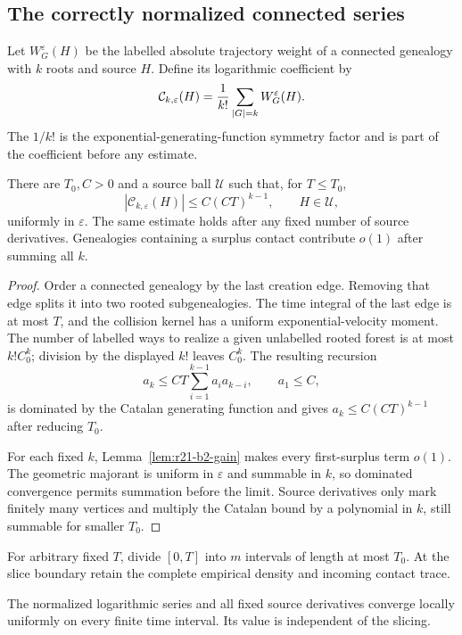\subsection{The correctly normalized connected series}

Let $W_G^\varepsilon(H)$ be the labelled absolute trajectory weight of a
connected genealogy with $k$ roots and source $H$.  Define its logarithmic
coefficient by
\[
 \mathcal C_{k,\varepsilon}(H)=
 {1\over k!}\sum_{|G|=k}W_G^\varepsilon(H).
\]
The $1/k!$ is the exponential-generating-function symmetry factor and is part
of the coefficient before any estimate.

\begin{theorem}
\label{thm:r21-b2-majorant}
There are $T_0,C>0$ and a source ball $\mathcal U$ such that, for
$T\le T_0$,
\[
 |\mathcal C_{k,\varepsilon}(H)|
 \le C(C T)^{k-1},
 \qquad H\in\mathcal U,
\]
uniformly in $\varepsilon$.  The same estimate holds after any fixed number
of source derivatives.  Genealogies containing a surplus contact contribute
$o(1)$ after summing all $k$.
\end{theorem}

\begin{proof}
Order a connected genealogy by the last creation edge.  Removing that edge
splits it into two rooted subgenealogies.  The time integral of the last edge
is at most $T$, and the collision kernel has a uniform exponential-velocity
moment.  The number of labelled ways to realize a given unlabelled rooted
forest is at most $k!C_0^k$; division by the displayed $k!$ leaves $C_0^k$.
The resulting recursion
\[
 a_k\le CT\sum_{i=1}^{k-1}a_i a_{k-i},
 \qquad a_1\le C,
\]
is dominated by the Catalan generating function and gives
$a_k\le C(CT)^{k-1}$ after reducing $T_0$.

For each fixed $k$, Lemma~\ref{lem:r21-b2-gain} makes every first-surplus term
$o(1)$.  The geometric majorant is uniform in $\varepsilon$ and summable in
$k$, so dominated convergence permits summation before the limit.  Source
derivatives only mark finitely many vertices and multiply the Catalan bound by
a polynomial in $k$, still summable for smaller $T_0$.
\end{proof}

For arbitrary fixed $T$, divide $[0,T]$ into $m$ intervals of length at most
$T_0$.  At the slice boundary retain the complete empirical density and
incoming contact trace.

\begin{corollary}
\label{cor:r21-b2-slicing}
The normalized logarithmic series and all fixed source derivatives converge
locally uniformly on every finite time interval.  Its value is independent of
the slicing.
\end{corollary}

